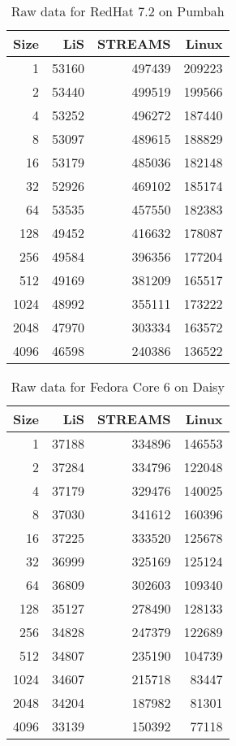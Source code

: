 \documentclass[letterpaper,final,notitlepage,twocolumn,10pt,twoside]{article}
\let\normalsize = \small
\let\small = \footnotesize
\let\footnotesize = \scriptsize
\let\scriptsize = \tiny
\begin{document}
\begin{appendix}
\begin{table}[hp]
\footnotesize
\setlength{\tabcolsep}{0.3em}
\setlength{\arraycolsep}{0.3em}
\begin{center}
\begin{tabular}{rrrr}\\
\hline
Size & LiS & STREAMS & Linux\\
\hline
\hline
1 & 53160 & 497439 & 209223\\
2 & 53440 & 499519 & 199566\\
4 & 53252 & 496272 & 187440\\
8 & 53097 & 489615 & 188829\\
16 & 53179 & 485036 & 182148\\
32 & 52926 & 469102 & 185174\\
64 & 53535 & 457550 & 182383\\
128 & 49452 & 416632 & 178087\\
256 & 49584 & 396356 & 177204\\
512 & 49169 & 381209 & 165517\\
1024 & 48992 & 355111 & 173222\\
2048 & 47970 & 303334 & 163572\\
4096 & 46598 & 240386 & 136522\\
\hline
\end{tabular}
\end{center}
\caption{Raw data for RedHat 7.2 on Pumbah}
\label{table:rh7data}
\normalsize
\end{table}

\begin{table}[hp]
\footnotesize
\setlength{\tabcolsep}{0.3em}
\setlength{\arraycolsep}{0.3em}
\begin{center}
\begin{tabular}{rrrr}\\
\hline
Size & LiS & STREAMS & Linux\\
\hline
\hline
1 & 37188 & 334896 & 146553\\
2 & 37284 & 334796 & 122048\\
4 & 37179 & 329476 & 140025\\
8 & 37030 & 341612 & 160396\\
16 & 37225 & 333520 & 125678\\
32 & 36999 & 325169 & 125124\\
64 & 36809 & 302603 & 109340\\
128 & 35127 & 278490 & 128133\\
256 & 34828 & 247379 & 122689\\
512 & 34807 & 235190 & 104739\\
1024 & 34607 & 215718 & 83447\\
2048 & 34204 & 187982 & 81301\\
4096 & 33139 & 150392 & 77118\\
\hline
\end{tabular}
\end{center}
\caption{Raw data for Fedora Core 6 on Daisy}
\label{table:smpdata}
\normalsize
\end{table}


\end{appendix}
\end{document}

